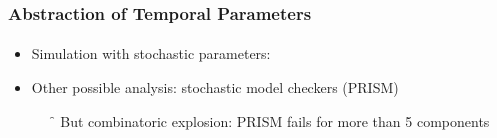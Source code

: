 \begin{frame}[c]
  \frametitle{Abstraction of Temporal Parameters}
  \framesubtitle{\tcite{\paulevephd}}

\begin{itemize}
  \item Simulation with stochastic parameters:
\end{itemize}

\medskip

\scalebox{.8}{}
\scalebox{.8}{}
\scalebox{.8}{}

\bigskip
\bigskip

\begin{itemize}
  \item Other possible analysis: stochastic model checkers (PRISM)
  \begin{itemize}
    \item[\f] But combinatoric explosion: PRISM fails for more than 5 components
  \end{itemize}

\end{itemize}

\end{frame}



